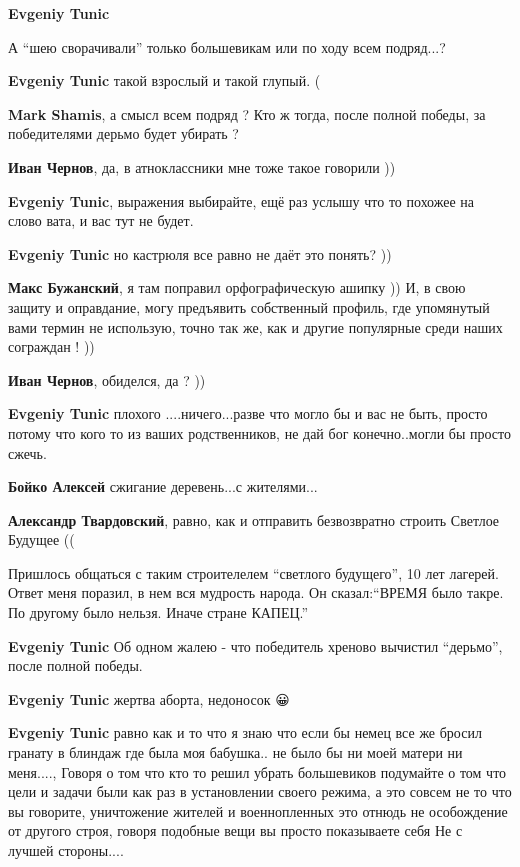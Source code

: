\begin{itemize}
\begin{itemize}
\textbf{Evgeniy Tunic}

А \enquote{шею сворачивали} только большевикам или по ходу всем подряд...?🤔

\textbf{Evgeniy Tunic} такой взрослый и такой глупый. (

\textbf{Mark Shamis}, а смысл всем подряд ? Кто ж тогда, после полной победы, за победителями дерьмо будет убирать ?

\textbf{Иван Чернов}, да, в атноклассники мне тоже такое говорили ))

\textbf{Evgeniy Tunic}, выражения выбирайте, ещё раз услышу что то похожее на слово вата, и вас тут не будет.

\textbf{Evgeniy Tunic} но кастрюля все равно не даёт это понять? ))

\textbf{Макс Бужанский}, я там поправил орфографическую ашипку )) И, в свою
защиту и оправдание, могу предъявить собственный профиль, где упомянутый вами
термин не использую, точно так же, как и другие популярные среди наших
сограждан ! ))

\textbf{Иван Чернов}, обиделся, да ? ))

\textbf{Evgeniy Tunic} плохого ....ничего...разве что могло бы и вас не быть,
просто потому что кого то из ваших родственников, не дай бог конечно..могли бы
просто сжечь.

\textbf{Бойко Алексей} сжигание деревень...с жителями...

\textbf{Александр Твардовский}, равно, как и отправить безвозвратно строить Светлое Будущее ((


Пришлось общаться с таким строителелем \enquote{светлого будущего}, 10 лет лагерей.
Ответ меня поразил, в нем вся мудрость народа.  Он сказал:\enquote{ВРЕМЯ было такре. По
другому было нельзя. Иначе стране КАПЕЦ.}

\textbf{Evgeniy Tunic}
Об одном жалею - что победитель хреново вычистил \enquote{дерьмо}, после полной победы.

\textbf{Evgeniy Tunic} жертва аборта, недоносок 😀


\textbf{Evgeniy Tunic} равно как и то что я знаю что если бы немец все же
бросил гранату в блиндаж где была моя бабушка.. не было бы ни моей матери ни
меня...., Говоря о том что кто то решил убрать большевиков подумайте о том что
цели и задачи были как раз в установлении своего режима, а это совсем не то что
вы говорите, уничтожение жителей и военнопленных это отнюдь не особождение от
другого строя, говоря подобные вещи вы просто показываете себя Не с лучшей
стороны....


\end{itemize}
\end{itemize}

